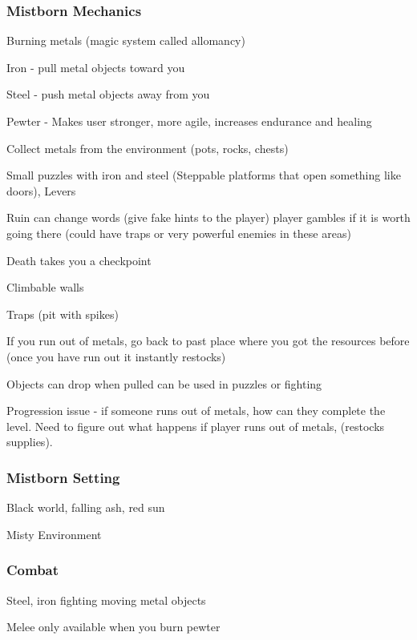 \documentclass{article}
\begin{document}
\subsubsection{Mistborn Mechanics}
\begin{description}
\item Burning metals (magic system called allomancy)
\item Iron - pull metal objects toward you
\item Steel - push metal objects away from you
\item Pewter - Makes user stronger, more agile, increases endurance and healing
\item Collect metals from the environment (pots, rocks, chests)
\item Small puzzles with iron and steel (Steppable platforms that open something like doors), Levers
\item Ruin can change words (give fake hints to the player) player gambles if it is worth going there (could have traps or very powerful enemies in these areas)
\item Death takes you a checkpoint
\item Climbable walls
\item Traps (pit with spikes)
\item If you run out of metals, go back to past place where you got the resources before (once you have run out it instantly restocks)
\item Objects can drop when pulled can be used in puzzles or fighting
\item Progression issue - if someone runs out of metals, how can they complete the level.
Need to figure out what happens if player runs out of metals, (restocks supplies).
\end{description}

\subsubsection{Mistborn Setting}
\begin{description}
\item Black world, falling ash, red sun
\item Misty Environment
\end{description}

\subsubsection{Combat}
\begin{description}
\item Steel, iron fighting moving metal objects
\item Melee only available when you burn pewter
\end{description}
\end{document}
